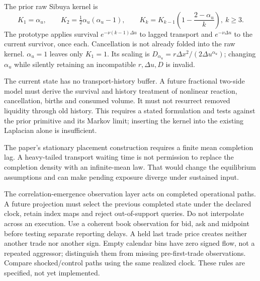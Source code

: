 \documentclass[11pt,a4paper]{article}
\newcommand{\du}{\Delta u}\newcommand{\dx}{\Delta x}
\begin{document}
The prior raw Sibuya kernel is
\[
 K_1=\alpha_u,\qquad K_2=\tfrac12\alpha_u(\alpha_u-1),\qquad
 K_k=K_{k-1}\left(1-\frac{2-\alpha_u}{k}\right),\ k\geq3.
\]
The prototype applies survival $e^{-\nu(k-1)\du}$ to lagged transport
and $e^{-\nu\du}$ to the current survivor, once each. Cancellation is not
already folded into the raw kernel. $\alpha_u=1$ leaves only $K_1=1$.
Its scaling is $D_{\alpha_u}=r\dx^2/(2\du^{\alpha_u})$; changing
$\alpha_u$ while silently retaining an incompatible $r,\du,D$ is invalid.

The current state has no transport-history buffer. A future fractional
two-side model must derive the survival and history treatment of nonlinear
reaction, cancellation, births and consumed volume. It must not resurrect
removed liquidity through old history. This requires a stated formulation
and tests against the prior primitive and its Markov limit; inserting the
kernel into the existing Laplacian alone is insufficient.

The paper's stationary placement construction requires a finite mean
completion lag. A heavy-tailed transport waiting time is not permission to
replace the completion density with an infinite-mean law. That would change
the equilibrium assumptions and can make pending exposure diverge under
sustained input.

The correlation-emergence observation layer acts on completed operational
paths. A future projection must select the previous completed state under
the declared clock, retain index maps and reject out-of-support queries.
Do not interpolate across an execution. Use a coherent book observation for
bid, ask and midpoint before testing separate reporting delays. A held last
trade price creates neither another trade nor another sign. Empty calendar
bins have zero signed flow, not a repeated aggressor; distinguish them from
missing pre-first-trade observations. Compare shocked/control paths using
the same realized clock. These rules are specified, not yet implemented.
\end{document}
